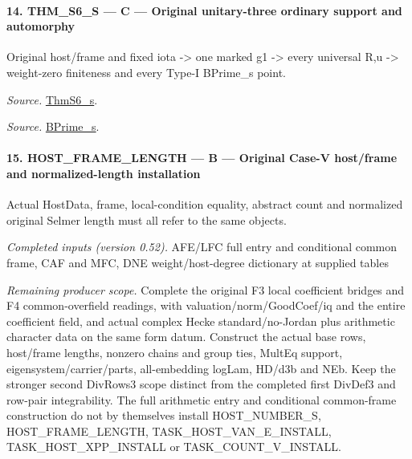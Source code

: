 \paragraph{14. THM\_\allowbreak S6\_\allowbreak S — C — Original unitary-three ordinary support and automorphy}

Original host/frame and fixed iota -> one marked g1 -> every universal R,u -> weight-zero finiteness and every Type-I BPrime\_\allowbreak s point.

\emph{Source.} \href{https://github.com/CocoSgt/riemann-hypothesis-lean/blob/7cbf7a0c32fca1badf05931879a37c3f8a2b03b4/src/Development/AutomorphicArithmetic/AutomorphicVarieties/ModularityArgument/ThresholdArguments/DenseThresholdCases/ThmS6CoreS.lean#L17-L26}{ThmS6\_\allowbreak s}.

\emph{Source.} \href{https://github.com/CocoSgt/riemann-hypothesis-lean/blob/7cbf7a0c32fca1badf05931879a37c3f8a2b03b4/src/Development/AutomorphicArithmetic/AutomorphicVarieties/ModularityArgument/ThresholdArguments/DenseThresholdCases/ThmS6CoreS.lean#L12-L16}{BPrime\_\allowbreak s}.



\paragraph{15. HOST\_\allowbreak FRAME\_\allowbreak LENGTH — B — Original Case-V host/frame and normalized-length installation}

Actual HostData, frame, local-condition equality, abstract count and normalized original Selmer length must all refer to the same objects.

\emph{Completed inputs (version 0.52).} AFE/LFC full entry and conditional common frame, CAF and MFC, DNE weight/host-degree dictionary at supplied tables

\emph{Remaining producer scope.} Complete the original F3 local coefficient bridges and F4 common-overfield readings, with valuation/norm/GoodCoef/iq and the entire coefficient field, and actual complex Hecke standard/no-Jordan plus arithmetic character data on the same form datum. Construct the actual base rows, host/frame lengths, nonzero chains and group ties, MultEq support, eigensystem/carrier/parts, all-embedding logLam, HD/d3b and NEb. Keep the stronger second DivRows3 scope distinct from the completed first DivDef3 and row-pair integrability. The full arithmetic entry and conditional common-frame construction do not by themselves install HOST\_\allowbreak NUMBER\_\allowbreak S, HOST\_\allowbreak FRAME\_\allowbreak LENGTH, TASK\_\allowbreak HOST\_\allowbreak VAN\_\allowbreak E\_\allowbreak INSTALL, TASK\_\allowbreak HOST\_\allowbreak XPP\_\allowbreak INSTALL or TASK\_\allowbreak COUNT\_\allowbreak V\_\allowbreak INSTALL.


